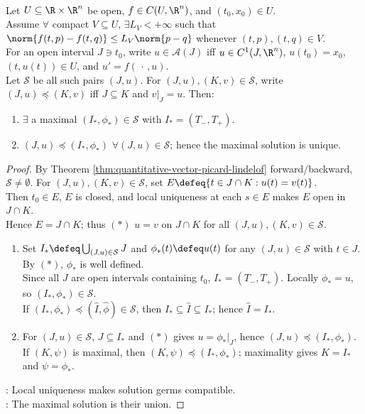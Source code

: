 \begin{theorem} \label{thm:unique-maximal-ode-solution} \\
Let $U\subseteq\R\times\R^n$ be open, $f\in C(U,\R^n)$, and $(t_0,x_0)\in U$.\\
Assume $\forall$ compact $V\subseteq U$, $\exists L_V<+\infty$ such that $\norm{f(t,p)-f(t,q)}\leq L_V\norm{p-q}$ whenever $(t,p),(t,q)\in V$.\\
For an open interval $J\ni t_0$, write $u\in\mathcal{A}(J)$ iff $u\in C^1(J,\R^n)$, $u(t_0)=x_0$, $(t,u(t))\in U$, and $u'=f(\,\cdot\,,u)$.\\
Let $\mathcal{S}$ be all such pairs $(J,u)$. For $(J,u),(K,v)\in\mathcal{S}$, write $(J,u)\preceq(K,v)$ iff $J\subseteq K$ and $v|_J=u$. Then:
\begin{enumerate}[label=(\roman*)]
\setlength{\itemsep}{0pt}
\item $\exists$ a maximal $(I_*,\phi_*)\in\mathcal{S}$ with $I_*=(T_-,T_+)$.
\item $(J,u)\preceq(I_*,\phi_*)$ $\forall (J,u)\in\mathcal{S}$; hence the maximal solution is unique.
\end{enumerate}
\begin{proof} By Theorem \ref{thm:quantitative-vector-picard-lindelof} forward/backward, $\mathcal{S}\neq\emptyset$. For $(J,u),(K,v)\in\mathcal{S}$, set $E\defeq\{t\in J\cap K:u(t)=v(t)\}$.\\
Then $t_0\in E$, $E$ is closed, and local uniqueness at each $s\in E$ makes $E$ open in $J\cap K$.\\
Hence $E=J\cap K$; thus $(*)$ $u=v$ on $J\cap K$ for all $(J,u),(K,v)\in\mathcal{S}$.
\begin{enumerate}[label=(\roman*)]
\setlength{\itemsep}{0pt}
\item Set $I_*\defeq\bigcup_{(J,u)\in\mathcal{S}}J$ and $\phi_*(t)\defeq u(t)$ for any $(J,u)\in\mathcal{S}$ with $t\in J$. By $(*)$, $\phi_*$ is well defined.\\
Since all $J$ are open intervals containing $t_0$, $I_*=(T_-,T_+)$. Locally $\phi_*=u$, so $(I_*,\phi_*)\in\mathcal{S}$.\\
If $(I_*,\phi_*)\preceq(\widehat I,\widehat\phi)\in\mathcal{S}$, then $I_*\subseteq\widehat I\subseteq I_*$; hence $\widehat I=I_*$.
\item For $(J,u)\in\mathcal{S}$, $J\subseteq I_*$ and $(*)$ gives $u=\phi_*|_J$, hence $(J,u)\preceq(I_*,\phi_*)$.\\
If $(K,\psi)$ is maximal, then $(K,\psi)\preceq(I_*,\phi_*)$; maximality gives $K=I_*$ and $\psi=\phi_*$.
\end{enumerate}
: Local uniqueness makes solution germs compatible.\\
: The maximal solution is their union.
\end{proof}
\end{theorem}

